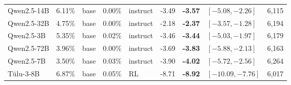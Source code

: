 \begin{table}[tb]
\begin{tabular}{lrlrl@{\hspace{8pt}}rrlr}
Qwen2.5-14B & 6.11\% & base & 0.00\% & instruct & -3.49 & \textbf{-3.57} & $[-5.08{,}-2.26]$ & 6{,}115 \\
Qwen2.5-32B & 4.75\% & base & 0.00\% & instruct & -2.18 & \textbf{-2.37} & $[-3.57{,}-1.28]$ & 6{,}194 \\
Qwen2.5-3B & 5.35\% & base & 0.02\% & instruct & -3.46 & \textbf{-3.44} & $[-5.03{,}-1.97]$ & 6{,}179 \\
Qwen2.5-72B & 3.96\% & base & 0.00\% & instruct & -3.69 & \textbf{-3.83} & $[-5.88{,}-2.13]$ & 6{,}163 \\
Qwen2.5-7B & 3.50\% & base & 0.03\% & instruct & -3.90 & \textbf{-4.02} & $[-5.72{,}-2.56]$ & 6{,}264 \\
T\"ulu-3-8B & 6.87\% & base & 0.05\% & RL & -8.71 & \textbf{-8.92} & $[-10.09{,}-7.76]$ & 6{,}017 \\
\bottomrule
\end{tabular}
\end{table}
